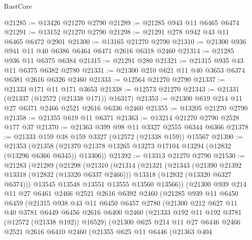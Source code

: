 \begin{lexlean}{RustCore}
\begin{coremodule}
@21285 := @13426 @21270 @2790
@21289 := @21285 @943 @11 @6465 @6474
@21291 := @13152 @21270 @2790
@21298 := @21291 @278 @942 @43 @11 @6465 @6472 @2901
@21300 := @13165 @21270 @2790
@21310 := @21300 @936 @941 @11 @40 @6386 @6464 @6471 @2616 @6318 @2460
@21314 := @21285 @936 @11 @6375 @6384
@21315 := @21291 @280
@21321 := @21315 @935 @43 @11 @6375 @6382 @2780
@21331 := @21300 @210 @621 @11 @40 @3653 @6374 @6381 @2616 @6326 @2460
@21333 := @12564 @21270 @2790
@21337 := @21333 @171 @11 @171 @3653
@21338 := @12573 @21270
@21343 := @21331 (@21337 (@12572 (@21338 @171)) @16317)
@21353 := @21300 @619 @214 @11 @27 @6371 @2466 @2521 @2616 @6336 @2460
@21355 := @13205 @21270 @2790
@21358 := @21355 @619 @11 @6371
@21363 := @13214 @21270 @2790 @2528 @177 @37
@21370 := @21363 @399 @98 @11 @3327 @2555 @6344 @6366
@21378 := @21333 @159 @38 @159 @3327 (@12572 (@21338 @159)) @15567
@21390 := @21353
    (@21358 (@21370 @21378 @13265 @13273 @17104 @13294 (@12832 (@13296 @6366 @6345)) @13306))
@21392 := @13313 @21270 @2790
@21530 := @21283
    (@21289
      (@21298
        (@21310
          (@21314
            (@21321
              (@21343
                (@21390 @21392 @13318 (@12832 (@13320 @6337 @2466)))
                @13318
                (@12832 (@13320 @6327 @6374)))
              @13545
              @13548
              @13551
              @13555
              @13560
              @13566))
          (@21300
            @939
            @214
            @11
            @27
            @6461
            @2466
            @2521
            @2616
            @6392
            @2460
            (@21285
              @939
              @11
              @6450
              @6459
              (@21315
                @938
                @43
                @11
                @6450
                @6457
                @2780
                (@21300
                  @212
                  @627
                  @11
                  @40
                  @3781
                  @6449
                  @6456
                  @2616
                  @6400
                  @2460
                  (@21333 @192 @11 @192 @3781 (@12572 (@21338 @192)) @16529)
                  (@21300
                    @625
                    @214
                    @11
                    @27
                    @6446
                    @2466
                    @2521
                    @2616
                    @6410
                    @2460
                    (@21355
                      @625
                      @11
                      @6446
                      (@21363
                        @404

\end{coremodule}
\end{lexlean}
